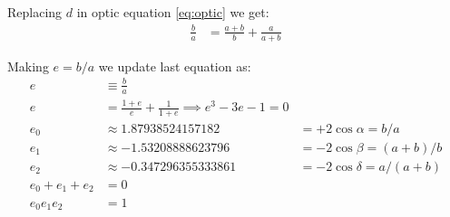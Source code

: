 \documentclass[11pt]{article}
\begin{document}
Replacing $d$ in optic equation \ref{eq:optic} we get:
\begin{align}
\frac{b}{a} &= \frac{a+b}{b} + \frac{a}{a+b}
\end{align}

Making $e = b/a$ we update last equation as:
\begin{align}
e &\equiv \frac{b}{a} \nonumber\\
e &= \frac{1+e}{e} + \frac{1}{1+e} \implies \boxed{ e^3 - 3e - 1 = 0 } \\
e_0 &\approx 1.87938524157182   &= +2\cos\alpha = b/a \nonumber\\
e_1 &\approx -1.53208888623796  &= -2\cos\beta = (a+b)/b \nonumber\\
e_2 &\approx -0.347296355333861 &= -2\cos\delta = a/(a+b) \nonumber\\
e_0 + e_1 + e_2 &= 0 \\
e_0e_1e_2 &= 1
\end{align}
\end{document}
